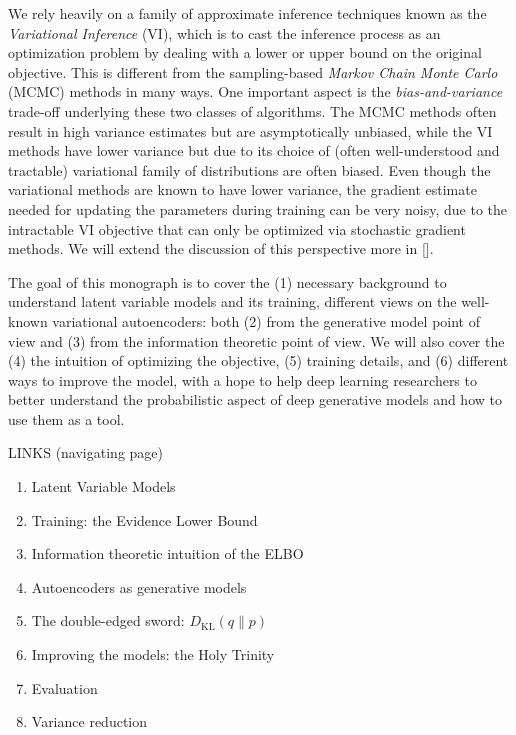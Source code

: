 \documentclass{article}
\newcommand{\KL}[2]{D_{\mathrm{KL}}\left( #1 \| #2 \right)}
\begin{document}
We rely heavily on a family of approximate inference techniques known as the \textit{Variational Inference} (VI), which is to cast the inference process as an optimization problem by dealing with a lower or upper bound on the original objective. 
This is different from the sampling-based \textit{Markov Chain Monte Carlo} (MCMC) methods in many ways. 
One important aspect is the \textit{bias-and-variance} trade-off underlying these two classes of algorithms. 
The MCMC methods often result in high variance estimates but are asymptotically unbiased, while the VI methods have lower variance but due to its choice of (often well-understood and tractable) variational family of distributions are often biased. 
Even though the variational methods are known to have lower variance, the gradient estimate needed for updating the parameters during training can be very noisy, due to the intractable VI objective that can only be optimized via stochastic gradient methods. 
We will extend the discussion of this perspective more in [].



The goal of this monograph is to cover the (1) necessary background to understand latent variable models and its training, different views on the well-known variational autoencoders: both (2) from the generative model point of view and (3) from the information theoretic point of view. 
We will also cover the (4) the intuition of optimizing the objective, (5) training details, and (6) different ways to improve the model, with a hope to help deep learning researchers to better understand the probabilistic aspect of deep generative models and how to use them as a tool. 





LINKS (navigating page)
\begin{enumerate}
\item Latent Variable Models
\item Training: the Evidence Lower Bound
\item Information theoretic intuition of the ELBO
\item Autoencoders as generative models
\item The double-edged sword: $\KL{q}{p}$
\item Improving the models: the Holy Trinity
\item Evaluation
\item Variance reduction
\end{enumerate}
\end{document}
